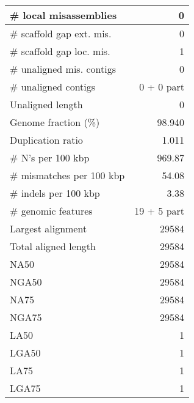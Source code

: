 \documentclass[12pt,a4paper]{article}
\begin{document}
\begin{table}[ht]
\begin{center}
\begin{tabular}{|l*{1}{|r}|}
\# local misassemblies & 0 \\ \hline
\# scaffold gap ext. mis. & 0 \\ \hline
\# scaffold gap loc. mis. & 1 \\ \hline
\# unaligned mis. contigs & 0 \\ \hline
\# unaligned contigs & 0 + 0 part \\ \hline
Unaligned length & 0 \\ \hline
Genome fraction (\%) & 98.940 \\ \hline
Duplication ratio & 1.011 \\ \hline
\# N's per 100 kbp & 969.87 \\ \hline
\# mismatches per 100 kbp & 54.08 \\ \hline
\# indels per 100 kbp & 3.38 \\ \hline
\# genomic features & 19 + 5 part \\ \hline
Largest alignment & 29584 \\ \hline
Total aligned length & 29584 \\ \hline
NA50 & 29584 \\ \hline
NGA50 & 29584 \\ \hline
NA75 & 29584 \\ \hline
NGA75 & 29584 \\ \hline
LA50 & 1 \\ \hline
LGA50 & 1 \\ \hline
LA75 & 1 \\ \hline
LGA75 & 1 \\ \hline
\end{tabular}
\end{center}
\end{table}
\end{document}
